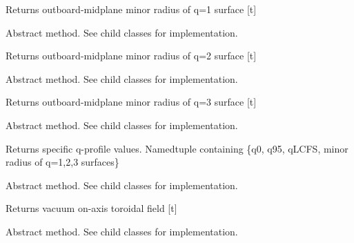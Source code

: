 \documentclass[letterpaper,10pt,english]{sphinxmanual}
\begin{document}
\begin{fulllineitems}
\begin{fulllineitems}
Returns outboard-midplane minor radius of q=1 surface {[}t{]}

\end{fulllineitems}


\begin{fulllineitems}
\label{eqtools:eqtools.core.Equilibrium.getQ2Surf}
Abstract method.  See child classes for implementation.

Returns outboard-midplane minor radius of q=2 surface {[}t{]}

\end{fulllineitems}


\begin{fulllineitems}
\label{eqtools:eqtools.core.Equilibrium.getQ3Surf}
Abstract method.  See child classes for implementation.

Returns outboard-midplane minor radius of q=3 surface {[}t{]}

\end{fulllineitems}


\begin{fulllineitems}
\label{eqtools:eqtools.core.Equilibrium.getQs}
Abstract method.  See child classes for implementation.

Returns specific q-profile values.
Namedtuple containing \{q0, q95, qLCFS, minor radius of q=1,2,3 surfaces\}

\end{fulllineitems}


\begin{fulllineitems}
\label{eqtools:eqtools.core.Equilibrium.getBtVac}
Abstract method.  See child classes for implementation.

Returns vacuum on-axis toroidal field {[}t{]}

\end{fulllineitems}


\begin{fulllineitems}
\label{eqtools:eqtools.core.Equilibrium.getBtPla}
Abstract method.  See child classes for implementation.


\end{fulllineitems}
\end{fulllineitems}
\end{document}

